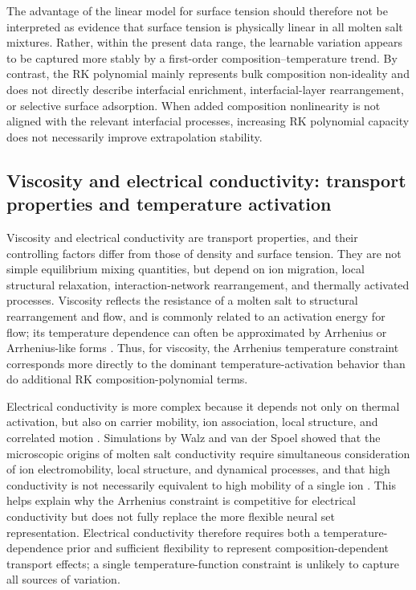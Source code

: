 \documentclass[journal=jctcce,manuscript=article,doi=true]{achemso}
\begin{document}
The advantage of the linear model for surface tension should therefore not be interpreted as evidence that surface tension is physically linear in all molten salt mixtures. Rather, within the present data range, the learnable variation appears to be captured more stably by a first-order composition--temperature trend. By contrast, the RK polynomial mainly represents bulk composition non-ideality and does not directly describe interfacial enrichment, interfacial-layer rearrangement, or selective surface adsorption. When added composition nonlinearity is not aligned with the relevant interfacial processes, increasing RK polynomial capacity does not necessarily improve extrapolation stability.

\subsection{Viscosity and electrical conductivity: transport properties and temperature activation}\label{sec:discussion-transport}

Viscosity and electrical conductivity are transport properties, and their controlling factors differ from those of density and surface tension. They are not simple equilibrium mixing quantities, but depend on ion migration, local structural relaxation, interaction-network rearrangement, and thermally activated processes. Viscosity reflects the resistance of a molten salt to structural rearrangement and flow, and is commonly related to an activation energy for flow; its temperature dependence can often be approximated by Arrhenius or Arrhenius-like forms \cite{janz1988molten,zhao2023viscosity}. Thus, for viscosity, the Arrhenius temperature constraint corresponds more directly to the dominant temperature-activation behavior than do additional RK composition-polynomial terms.

Electrical conductivity is more complex because it depends not only on thermal activation, but also on carrier mobility, ion association, local structure, and correlated motion \cite{harris2016transport}. Simulations by Walz and van der Spoel showed that the microscopic origins of molten salt conductivity require simultaneous consideration of ion electromobility, local structure, and dynamical processes, and that high conductivity is not necessarily equivalent to high mobility of a single ion \cite{walz2021microscopic}. This helps explain why the Arrhenius constraint is competitive for electrical conductivity but does not fully replace the more flexible neural set representation. Electrical conductivity therefore requires both a temperature-dependence prior and sufficient flexibility to represent composition-dependent transport effects; a single temperature-function constraint is unlikely to capture all sources of variation.
\end{document}
